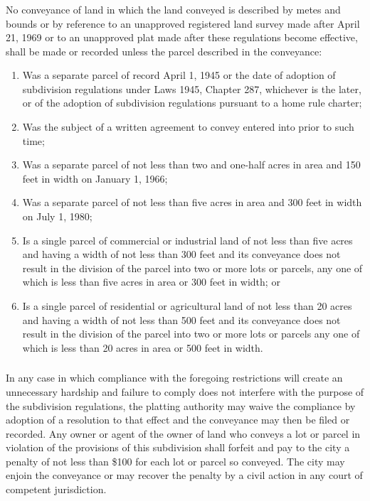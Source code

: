 \subsubsection{}
No conveyance of land in which the land conveyed is described by metes and bounds or by reference to an unapproved registered land survey made after April 21, 1969 or to an unapproved plat made after these regulations become effective, shall be made or recorded unless the parcel described in the conveyance:
\begin{enumerate}[{\indent}a)]
    \item Was a separate parcel of record April 1, 1945 or the date of adoption of subdivision regulations under Laws 1945, Chapter 287, whichever is the later, or of the adoption of subdivision regulations pursuant to a home rule charter;
    \item Was the subject of a written agreement to convey entered into prior to such time;
    \item Was a separate parcel of not less than two and one-half acres in area and 150 feet in width on January 1, 1966;
    \item Was a separate parcel of not less than five acres in area and 300 feet in width on July 1, 1980;
    \item Is a single parcel of commercial or industrial land of not less than five acres and having a width of not less than 300 feet and its conveyance does not result in the division of the parcel into two or more lots or parcels, any one of which is less than five acres in area or 300 feet in width; or
    \item Is a single parcel of residential or agricultural land of not less than 20 acres and having a width of not less than 500 feet and its conveyance does not result in the division of the parcel into two or more lots or parcels any one of which is less than 20 acres in area or 500 feet in width.
\end{enumerate}
\subsubsection{}
In any case in which compliance with the foregoing restrictions will create an unnecessary hardship and failure to comply does not interfere with the purpose of the subdivision regulations, the platting authority may waive the compliance by adoption of a resolution to that effect and the conveyance may then be filed or recorded. Any owner or agent of the owner of land who conveys a lot or parcel in violation of the provisions of this subdivision shall forfeit and pay to the city a penalty of not less than \$100 for each lot or parcel so conveyed. The city may enjoin the conveyance or may recover the penalty by a civil action in any court of competent jurisdiction.
